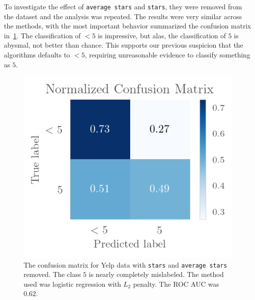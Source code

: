 To investigate the effect of \texttt{average stars} and \texttt{stars}, they were
removed from the dataset and the analysis was repeated. The results were very similar
across the methods, with the most important behavior summarized the confusion 
matrix in~\cref{fig:logregham}.
The classification of $<5$ is impressive, but alas, the classification of $5$ is abysmal, not better than chance. This supports our previous suspicion that the
algorithms defaults to $<5$, requiring unreasonable evidence to classify something 
as $5$. 

\begin{figure}[H]
    \centering
    \includegraphics{Figures/logreg_l2_ham.png}
    \caption{The confusion matrix for Yelp data with \texttt{stars} and
    \texttt{average stars} removed. The class $5$ is nearly completely mislabeled.
    The method used was logistic regression with $L_2$ penalty. The ROC AUC was $0.62$.}
    \label{fig:logregham}
\end{figure}